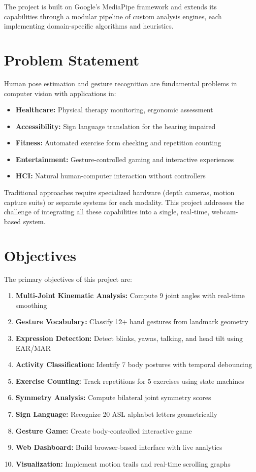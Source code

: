 \documentclass[a4paper,12pt]{report}
\begin{document}
The project is built on Google's MediaPipe framework and extends its capabilities through a modular pipeline of custom analysis engines, each implementing domain-specific algorithms and heuristics.

\section{Problem Statement}
Human pose estimation and gesture recognition are fundamental problems in computer vision with applications in:
\begin{itemize}
    \item \textbf{Healthcare:} Physical therapy monitoring, ergonomic assessment
    \item \textbf{Accessibility:} Sign language translation for the hearing impaired
    \item \textbf{Fitness:} Automated exercise form checking and repetition counting
    \item \textbf{Entertainment:} Gesture-controlled gaming and interactive experiences
    \item \textbf{HCI:} Natural human-computer interaction without controllers
\end{itemize}

Traditional approaches require specialized hardware (depth cameras, motion capture suits) or separate systems for each modality. This project addresses the challenge of integrating all these capabilities into a single, real-time, webcam-based system.

\section{Objectives}
The primary objectives of this project are:
\begin{enumerate}
    \item \textbf{Multi-Joint Kinematic Analysis:} Compute 9 joint angles with real-time smoothing
    \item \textbf{Gesture Vocabulary:} Classify 12+ hand gestures from landmark geometry
    \item \textbf{Expression Detection:} Detect blinks, yawns, talking, and head tilt using EAR/MAR
    \item \textbf{Activity Classification:} Identify 7 body postures with temporal debouncing
    \item \textbf{Exercise Counting:} Track repetitions for 5 exercises using state machines
    \item \textbf{Symmetry Analysis:} Compute bilateral joint symmetry scores
    \item \textbf{Sign Language:} Recognize 20 ASL alphabet letters geometrically
    \item \textbf{Gesture Game:} Create body-controlled interactive game
    \item \textbf{Web Dashboard:} Build browser-based interface with live analytics
    \item \textbf{Visualization:} Implement motion trails and real-time scrolling graphs
\end{enumerate}
\end{document}
